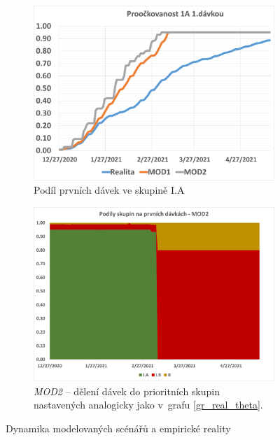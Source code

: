 \begin{figure}
\centering


\begin{subfigure}{0.9\textwidth}
\includegraphics[width=\textwidth]{prispevky/080-Logistika_ockovani/assets/vetsi_popisky/gr_1A_proockovanost}
\caption{Podíl prvních dávek ve skupině I.A}
\label{gr_mod_prvni_davka}
\end{subfigure}

\begin{subfigure}{0.9\textwidth}
\includegraphics[width=\textwidth]{assets/theta_mod2}
\caption{\emph{MOD2} -- dělení dávek do prioritních skupin nastavených analogicky jako v~grafu \ref{gr_real_theta}.}
\label{gr_mod2_theta}
\end{subfigure}

\caption{Dynamika modelovaných scénářů a empirické reality}

\end{figure}


